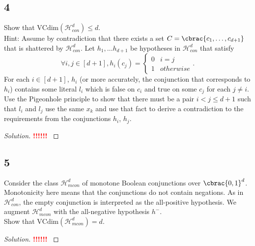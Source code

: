 \documentclass[10pt, a4paper, twoside]{amsart}
\DeclarePairedDelimiter\cbrac\{\}
\newcommand{\cH}{\ensuremath{\mathcal{H}}}
\newenvironment{solution}
               {\let\oldqedsymbol=\qedsymbol
                \renewcommand{\qedsymbol}{$\blacktriangleleft$}
                \begin{proof}[Solution]}
               {\end{proof}
                \renewcommand{\qedsymbol}{\oldqedsymbol}}
\newcommand{\TODO}{\textcolor{red}{\textbf{!!!!!! }}}
\begin{document}
\subsection*{4}
Show that $\text{VCdim}(\cH_{con}^d) \leq d$.\\
Hint: Assume by contradiction that there exists a set $C = \cbrac{c_1, \ldots , c_{d+1}}$ that is shattered by $\cH^d_{con}$. Let $h_1, \ldots h_{d+1}$ be hypotheses in $\cH^d_{con}$ that satisfy
\begin{equation*}
  \forall i,j \in [d+1], h_i(c_j) = \begin{cases} 0 & i=j \\
    1 & otherwise\end{cases}.
\end{equation*}
For each $i \in [d+1]$, $h_i$ (or more accurately, the conjunction that corresponds to $h_i$) contains some literal $l_i$ which is false on $c_i$ and true on some $c_j$ for each $j \neq i$. Use the Pigeonhole principle to show that there must be a pair $i < j \leq d+1$ such that $l_i$ and $l_j$ use the same $x_k$ and use that fact to derive a contradiction to the requirements from the conjunctions $h_i$, $h_j$.
\begin{solution}
\TODO
\end{solution}
\subsection*{5}
Consider the class $\cH^d_{mcon}$ of monotone Boolean conjunctions over $\cbrac{0,1}^d$. Monotonicity here means that the conjunctions do not contain negations. As in $\cH^d_{con}$, the empty conjunction is interpreted as the all-positive hypothesis. We augment $\cH^d_{mcon}$ with the all-negative hypothesis $h^-$.\\
Show that $\text{VCdim}(\cH_{mcon}^d) = d$.
\begin{solution}
\TODO
\end{solution}
\end{document}
